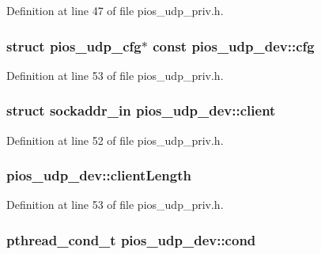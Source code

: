 Definition at line 47 of file pios\-\_\-udp\-\_\-priv.\-h.

\hypertarget{structpios__udp__dev_a896fde0b8234344b1e137dba0034cd65}{
\subsubsection[{cfg}]{\setlength{\rightskip}{0pt plus 5cm}struct {\bf pios\-\_\-udp\-\_\-cfg}$\ast$ {\bf const} pios\-\_\-udp\-\_\-dev\-::cfg}}\label{structpios__udp__dev_a896fde0b8234344b1e137dba0034cd65}


Definition at line 53 of file pios\-\_\-udp\-\_\-priv.\-h.

\hypertarget{structpios__udp__dev_a91da9fed751f33b5fc4c9ae2cc1a0328}{
\subsubsection[{client}]{\setlength{\rightskip}{0pt plus 5cm}struct sockaddr\-\_\-in pios\-\_\-udp\-\_\-dev\-::client}}\label{structpios__udp__dev_a91da9fed751f33b5fc4c9ae2cc1a0328}


Definition at line 52 of file pios\-\_\-udp\-\_\-priv.\-h.

\hypertarget{structpios__udp__dev_ac097971990d8961a5a9eb6df4c5922d8}{
\subsubsection[{client\-Length}]{ pios\-\_\-udp\-\_\-dev\-::client\-Length}}\label{structpios__udp__dev_ac097971990d8961a5a9eb6df4c5922d8}


Definition at line 53 of file pios\-\_\-udp\-\_\-priv.\-h.

\hypertarget{structpios__udp__dev_aa2ee1caa6f101cfa029b471fbfa40f9c}{
\subsubsection[{cond}]{\setlength{\rightskip}{0pt plus 5cm}pthread\-\_\-cond\-\_\-t pios\-\_\-udp\-\_\-dev\-::cond}}\label{structpios__udp__dev_aa2ee1caa6f101cfa029b471fbfa40f9c}



